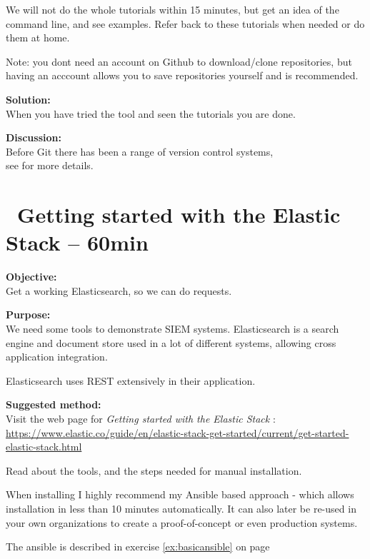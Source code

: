 \documentclass[a4paper,11pt,notitlepage]{report}
\begin{document}
We will not do the whole tutorials within 15 minutes, but get an idea of the command line, and see examples. Refer back to these tutorials when needed or do them at home.

Note: you dont need an account on Github to download/clone repositories, but having an acccount allows you to save repositories yourself and is recommended.

{\bf Solution:}\\
When you have tried the tool and seen the tutorials you are done.

{\bf Discussion:}\\
Before Git there has been a range of version control systems,\\
see  for more details.




\chapter{\faExclamationTriangle\ Getting started with the Elastic Stack -- 60min}
\label{gettingstartedelastic}



{\bf Objective:}\\
Get a working Elasticsearch, so we can do requests.

{\bf Purpose:}\\
We need some tools to demonstrate SIEM systems. Elasticsearch is a search engine and document store used in a lot of different systems, allowing cross application integration.

Elasticsearch uses REST extensively in their application.

{\bf Suggested method:}\\
Visit the web page for \emph{Getting started with the Elastic Stack} :\\
{\footnotesize\url{https://www.elastic.co/guide/en/elastic-stack-get-started/current/get-started-elastic-stack.html}}

Read about the tools, and the steps needed for manual installation.

When installing I highly recommend my Ansible based approach - which allows installation in less than 10 minutes automatically. It can also later be re-used in your own organizations to create a proof-of-concept or even production systems.

The ansible is described in exercise \ref{ex:basicansible} on page \pageref{ex:basicansible}
\end{document}
